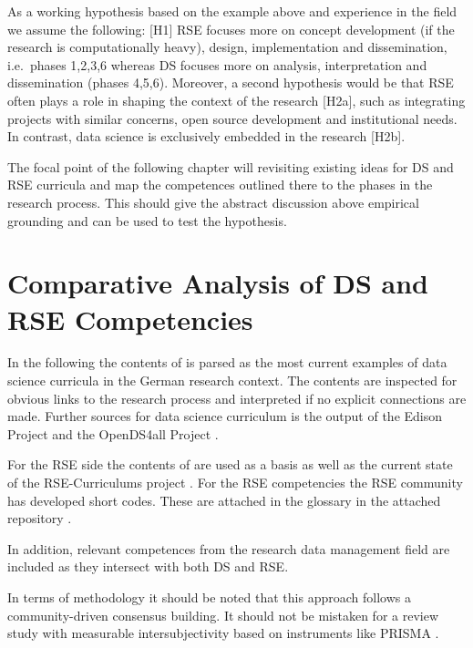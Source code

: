 \documentclass[
        english,biblatex
    ]{lni}
\begin{document}
    As a working hypothesis based on the example above and experience in
    the field we assume the following: {[}H1{]} RSE focuses more on
    concept development (if the research is computationally heavy),
    design, implementation and dissemination, i.e.~phases 1,2,3,6
    whereas DS focuses more on analysis, interpretation and
    dissemination (phases 4,5,6). Moreover, a second hypothesis would be
    that RSE often plays a role in shaping the context of the research
    {[}H2a{]}, such as integrating projects with similar concerns, open
    source development and institutional needs. In contrast, data
    science is exclusively embedded in the research {[}H2b{]}.

    The focal point of the following chapter will revisiting existing
    ideas for DS and RSE curricula and map the competences outlined
    there to the phases in the research process. This should give the
    abstract discussion above empirical grounding and can be used to
    test the hypothesis.

    \section{Comparative Analysis of DS and RSE
    Competencies}\label{comparative-analysis-of-ds-and-rse-competencies}

    In the following the contents of \autocite{GI2021DataScience} is
    parsed as the most current examples of data science curricula in the
    German research context. The contents are inspected for obvious
    links to the research process and interpreted if no explicit
    connections are made. Further sources for data science curriculum is
    the output of the Edison Project \autocite{EDSF2017} and the
    OpenDS4all Project \autocite{OpenDS4All2020}.

    For the RSE side the contents of \autocite{Goth2024RSE} are used as
    a basis as well as the current state of the RSE-Curriculums project
    \autocite{RSECurriculums2021}. For the RSE competencies the RSE
    community has developed short codes. These are attached in the
    glossary in the attached repository \autocite{ds2rse2025}.

    In addition, relevant competences from the research data management
    field \autocite{petersen_2025_15025246} are included as they
    intersect with both DS and RSE.

    In terms of methodology it should be noted that this approach
    follows a community-driven consensus building. It should not be
    mistaken for a review study with measurable intersubjectivity based
    on instruments like PRISMA \autocite{Page2021PRISMA}.
\end{document}
